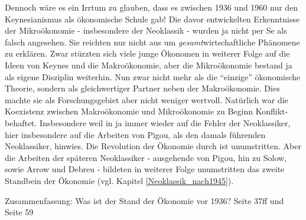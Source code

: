 Dennoch wäre es ein Irrtum zu glauben, dass es zwischen 1936 und 1960 nur den Keynesianismus als ökonomische Schule gab! 
Die davor entwickelten Erkenntnisse der Mikroökonomie - insbesondere der Neoklassik - wurden ja nicht per Se als falsch angesehen. Sie reichten nur nicht aus um \textit{gesamt}wirtschaftliche Phänomene zu erklären. Zwar stürzten sich viele junge Ökonomen in weiterer Folge auf die Ideen von Keynes und die Makroökonomie, aber die Mikroökonomie bestand ja als eigene Disziplin weiterhin. Nun zwar nicht mehr als die "`einzige"' ökonomische Theorie, sondern als gleichwertiger Partner neben der Makroökonomie. Dies machte sie als Forschungsgebiet aber nicht weniger wertvoll. Natürlich war die Koexistenz zwischen Makroökonomie und Mikroökonomie zu Beginn Konflikt-behaftet. Insbesondere weil in \textcite{Keynes1936} ja immer wieder auf die Fehler der Neoklassiker, hier insbesondere auf die Arbeiten von Pigou, als den damals führenden Neoklassiker, hinwies. Die Revolution der Ökonomie durch \textcite{Keynes1936} ist unumstritten. Aber die Arbeiten der späteren Neoklassiker - ausgehende von Pigou, hin zu Solow, sowie Arrow und Debreu - bildeten in weiterer Folge unumstritten das zweite Standbein der Ökonomie (vgl. Kapitel \ref{Neoklassik_nach1945}).







Zusammenfassung: Was ist der Stand der Ökonomie vor 1936?
Seite 37ff und Seite 59 \textcite{Snowdon2005}